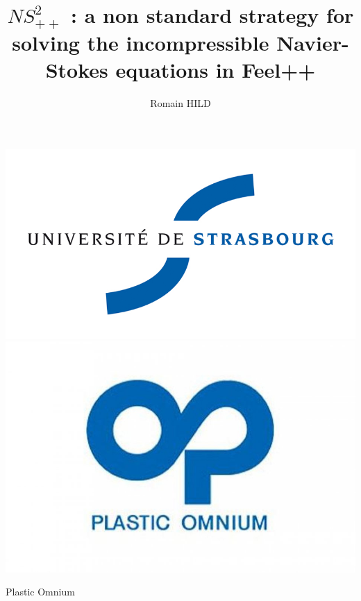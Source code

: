 \documentclass{beamer}
\title[$NS^2_{++}$]{$NS^2_{++}$ : a non standard strategy for solving the incompressible Navier-Stokes equations in Feel++}
\author{Romain HILD}
\institute{Université de Strasbourg}
\begin{document}
\begin{frame}
\includegraphics[scale=0.2]{uds.jpg}\includegraphics[scale=0.15]{po.jpg}
\titlepage
\end{frame}

\begin{frame}{Plastic Omnium}
\end{frame}
\end{document}
